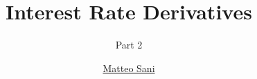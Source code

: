\documentclass{beamer}
\title{Interest Rate Derivatives}
\subtitle{Part 2}
\author{\href{mailto:matteo.sani@unisi.it}{Matteo Sani}}
\begin{document}
	\begin{frame}[plain]
		\maketitle
	\end{frame}

%
%
%
\end{document}
